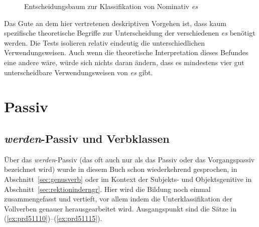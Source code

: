 \begin{figure}
  \caption{Entscheidungsbaum zur Klassifikation von Nominativ \textit{es}}
  \label{fig:escat}
\end{figure}

Das Gute an dem hier vertretenen deskriptiven Vorgehen ist, dass kaum spezifische theoretische Begriffe zur Unterscheidung der verschiedenen \textit{es} benötigt werden.
Die Tests isolieren relativ eindeutig die unterschiedlichen Verwendungsweisen.
Auch wenn die theoretische Interpretation dieses Befundes eine andere wäre, würde sich nichts daran ändern, dass es mindestens vier gut unterscheidbare Verwendungsweisen von \textit{es} gibt.

\section{Passiv}

\label{sec:passiv}

\subsection{\textit{werden}-Passiv und Verbklassen}

\label{sec:werdenpassiv}


Über das \textit{werden}-Passiv (das oft auch nur als das Passiv oder das Vorgangspassiv bezeichnet wird) wurde in diesem Buch schon wiederkehrend gesprochen, \zB in Abschnitt~\ref{sec:genusverb} oder im Kontext der Subjekts- und Objektsgenitive in Abschnitt~\ref{sec:rektioninderngr}.
Hier wird die Bildung noch einmal zusammengefasst und vertieft, vor allem indem die Unterklassifikation der Vollverben genauer herausgearbeitet wird.
Ausgangspunkt sind die Sätze in (\ref{ex:prd51110})--(\ref{ex:prd51115}).

\newcommand{\Lab}[1]{\ensuremath{_{\mathrm{#1}}}}

